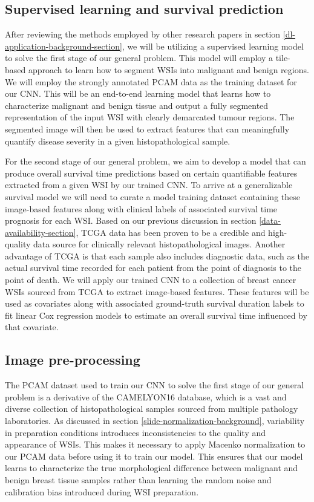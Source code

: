 \documentclass{l4proj}
\begin{document}
\subsection{Supervised learning and survival prediction}
After reviewing the methods employed by other research papers in section \ref{dl-application-background-section}, we will be utilizing a supervised learning model to solve the first stage of our general problem. This model will employ a tile-based approach to learn how to segment WSIs into malignant and benign regions. We will employ the strongly annotated PCAM data as the training dataset for our CNN. This will be an end-to-end learning model that learns how to characterize malignant and benign tissue and output a fully segmented representation of the input WSI with clearly demarcated tumour regions. The segmented image will then be used to extract features that can meaningfully quantify disease severity in a given histopathological sample. 

For the second stage of our general problem, we aim to develop a model that can produce overall survival time predictions based on certain quantifiable features extracted from a given WSI by our trained CNN. To arrive at a generalizable survival model we will need to curate a model training dataset containing these image-based features along with clinical labels of associated survival time prognosis for each WSI. Based on our previous discussion in section \ref{data-availability-section}, TCGA data has been proven to be a credible and high-quality data source for clinically relevant histopathological images. Another advantage of TCGA is that each sample also includes diagnostic data, such as the actual survival time recorded for each patient from the point of diagnosis to the point of death. We will apply our trained CNN to a collection of breast cancer WSIs sourced from TCGA to extract image-based features. These features will be used as covariates along with associated ground-truth survival duration labels to fit linear Cox regression models to estimate an overall survival time influenced by that covariate.

\subsection{Image pre-processing}
The PCAM dataset used to train our CNN to solve the first stage of our general problem is a derivative of the CAMELYON16 database, which is a vast and diverse collection of histopathological samples sourced from multiple pathology laboratories. As discussed in section \ref{slide-normalization-background}, variability in preparation conditions introduces inconsistencies to the quality and appearance of WSIs. This makes it necessary to apply Macenko normalization to our PCAM data before using it to train our model. This ensures that our model learns to characterize the true morphological difference between malignant and benign breast tissue samples rather than learning the random noise and calibration bias introduced during WSI preparation.
\end{document}
